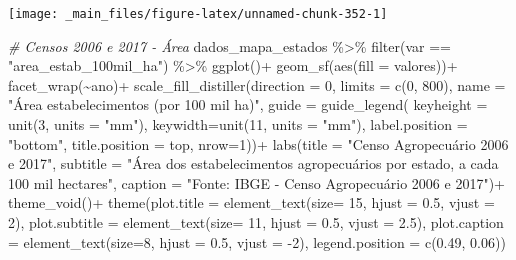 \documentclass[
  brazilian,
]{book}
\newenvironment{Shaded}{\begin{snugshade}}{\end{snugshade}}
\newcommand{\AttributeTok}[1]{\textcolor[rgb]{0.77,0.63,0.00}{#1}}
\newcommand{\CommentTok}[1]{\textcolor[rgb]{0.56,0.35,0.01}{\textit{#1}}}
\newcommand{\DecValTok}[1]{\textcolor[rgb]{0.00,0.00,0.81}{#1}}
\newcommand{\FloatTok}[1]{\textcolor[rgb]{0.00,0.00,0.81}{#1}}
\newcommand{\FunctionTok}[1]{\textcolor[rgb]{0.00,0.00,0.00}{#1}}
\newcommand{\NormalTok}[1]{#1}
\newcommand{\SpecialCharTok}[1]{\textcolor[rgb]{0.00,0.00,0.00}{#1}}
\newcommand{\StringTok}[1]{\textcolor[rgb]{0.31,0.60,0.02}{#1}}
\begin{document}
\begin{center}\texttt{[image: \_main\_files/figure-latex/unnamed-chunk-352-1]} \end{center}

\begin{Shaded}
\begin{Highlighting}[]
\CommentTok{\# Censos 2006 e 2017 {-} Área}
\NormalTok{dados\_mapa\_estados }\SpecialCharTok{\%\textgreater{}\%} 
  \FunctionTok{filter}\NormalTok{(var }\SpecialCharTok{==} \StringTok{"area\_estab\_100mil\_ha"}\NormalTok{) }\SpecialCharTok{\%\textgreater{}\%}
  \FunctionTok{ggplot}\NormalTok{()}\SpecialCharTok{+}
  \FunctionTok{geom\_sf}\NormalTok{(}\FunctionTok{aes}\NormalTok{(}\AttributeTok{fill =}\NormalTok{ valores))}\SpecialCharTok{+}
  \FunctionTok{facet\_wrap}\NormalTok{(}\SpecialCharTok{\textasciitilde{}}\NormalTok{ano)}\SpecialCharTok{+}
  \FunctionTok{scale\_fill\_distiller}\NormalTok{(}\AttributeTok{direction =} \DecValTok{0}\NormalTok{,}
                       \AttributeTok{limits =} \FunctionTok{c}\NormalTok{(}\DecValTok{0}\NormalTok{, }\DecValTok{800}\NormalTok{),}
                       \AttributeTok{name =} \StringTok{"Área estabelecimentos (por 100 mil ha)"}\NormalTok{,}
                       \AttributeTok{guide =} \FunctionTok{guide\_legend}\NormalTok{(}
                         \AttributeTok{keyheight =} \FunctionTok{unit}\NormalTok{(}\DecValTok{3}\NormalTok{, }\AttributeTok{units =} \StringTok{"mm"}\NormalTok{),}
                         \AttributeTok{keywidth=}\FunctionTok{unit}\NormalTok{(}\DecValTok{11}\NormalTok{, }\AttributeTok{units =} \StringTok{"mm"}\NormalTok{),}
                         \AttributeTok{label.position =} \StringTok{"bottom"}\NormalTok{,}
                         \AttributeTok{title.position =} \StringTok{\textquotesingle{}top\textquotesingle{}}\NormalTok{, }\AttributeTok{nrow=}\DecValTok{1}\NormalTok{))}\SpecialCharTok{+}
  \FunctionTok{labs}\NormalTok{(}\AttributeTok{title =} \StringTok{"Censo Agropecuário 2006 e 2017"}\NormalTok{,}
       \AttributeTok{subtitle =} \StringTok{"Área dos estabelecimentos agropecuários por estado, a cada 100 mil hectares"}\NormalTok{,}
       \AttributeTok{caption =} \StringTok{"Fonte: IBGE {-} Censo Agropecuário 2006 e 2017"}\NormalTok{)}\SpecialCharTok{+}
  \FunctionTok{theme\_void}\NormalTok{()}\SpecialCharTok{+}
  \FunctionTok{theme}\NormalTok{(}\AttributeTok{plot.title =} \FunctionTok{element\_text}\NormalTok{(}\AttributeTok{size=} \DecValTok{15}\NormalTok{, }\AttributeTok{hjust =} \FloatTok{0.5}\NormalTok{, }\AttributeTok{vjust =} \DecValTok{2}\NormalTok{),}
        \AttributeTok{plot.subtitle =} \FunctionTok{element\_text}\NormalTok{(}\AttributeTok{size=} \DecValTok{11}\NormalTok{, }\AttributeTok{hjust =} \FloatTok{0.5}\NormalTok{, }\AttributeTok{vjust =} \FloatTok{2.5}\NormalTok{),}
        \AttributeTok{plot.caption =} \FunctionTok{element\_text}\NormalTok{(}\AttributeTok{size=}\DecValTok{8}\NormalTok{, }\AttributeTok{hjust =} \FloatTok{0.5}\NormalTok{, }\AttributeTok{vjust =} \SpecialCharTok{{-}}\DecValTok{2}\NormalTok{),}
        \AttributeTok{legend.position =} \FunctionTok{c}\NormalTok{(}\FloatTok{0.49}\NormalTok{, }\FloatTok{0.06}\NormalTok{))}
\end{Highlighting}
\end{Shaded}
\end{document}
